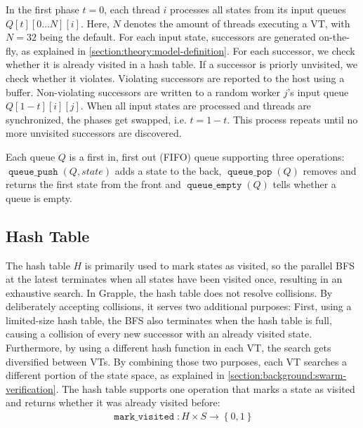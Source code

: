 \documentclass[
fancyheadings, %
%
%
]{stsreprt}
\DeclareMathOperator{\markVisited}{\texttt{mark\_visited}}
\DeclareMathOperator{\qEmpty}{\texttt{queue\_empty}}
\DeclareMathOperator{\qPop}{\texttt{queue\_pop}}
\DeclareMathOperator{\qPush}{\texttt{queue\_push}}
\begin{document}
In the first phase $t=0$, each thread $i$ processes all states from its input queues $Q\left[t\right]\left[ 0 \dots N \right]\left[i\right]$.
Here, $N$ denotes the amount of threads executing a VT, with $N=32$ being the default.
For each input state, successors are generated on-the-fly, as explained in \cref{section:theory:model-definition}.
For each successor, we check whether it is already visited in a hash table.
If a successor is priorly unvisited, we check whether it violates.
Violating successors are reported to the host using a buffer.
Non-violating successors are written to a random worker $j$'s input queue $Q\left[1 - t\right]\left[i\right]\left[j\right]$.
When all input states are processed and threads are synchronized, the phases get swapped, i.e. $t = 1 - t$.
This process repeats until no more unvisited successors are discovered.


Each queue $Q$ is a first in, first out (FIFO) queue supporting three operations: $\qPush(Q, state)$ adds a state to the back, $\qPop(Q)$ removes and returns the first state from the front and $\qEmpty(Q)$ tells whether a queue is empty.

\subsection{Hash Table}
\label{section:theory:hash-table}

The hash table $H$ is primarily used to mark states as visited, so the parallel BFS at the latest terminates when all states have been visited once, resulting in an exhaustive search.
In Grapple, the hash table does not resolve collisions.
By deliberately accepting collisions, it serves two additional purposes:
First, using a limited-size hash table, the BFS also terminates when the hash table is full, causing a collision of every new successor with an already visited state.
Furthermore, by using a different hash function in each VT, the search gets diversified between VTs.
By combining those two purposes, each VT searches a different portion of the state space, as explained in \cref{section:background:swarm-verification}.
The hash table supports one operation that marks a state as visited and returns whether it was already visited before:
\begin{align*}
    \markVisited : H \times S \to \left\{0, 1\right\}
\end{align*}
\end{document}
